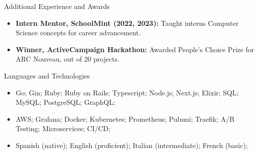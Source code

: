 \documentclass[]{mcdowellcv}
\begin{document}
	\begin{cvsection}{Additional Experience and Awards}
		\begin{cvsubsection}{}{}{}	
			\begin{itemize}
				\item \textbf{Intern Mentor, SchoolMint (2022, 2023):} Taught interns Computer Science concepts for career advancement.
				\item \textbf{Winner, ActiveCampaign Hackathon:} Awarded People's Choice Prize for ARC Nouveau, out of 20 projects.
			\end{itemize}
		\end{cvsubsection}
	\end{cvsection}
	\begin{cvsection}{Languages and Technologies}
		\begin{cvsubsection}{}{}{}	
			\begin{itemize}
				\item Go; Gin; Ruby; Ruby on Rails; Typescript; Node.js; Next.js; Elixir; SQL; MySQL; PostgreSQL; GraphQL;
				\item AWS; Grafana; Docker; Kubernetes; Prometheus; Pulumi; Traefik; A/B Testing; Microservices; CI/CD;
				\item Spanish (native); English (proficient); Italian (intermediate); French (basic);
			\end{itemize}
		\end{cvsubsection}
	\end{cvsection}
	
\end{document}

